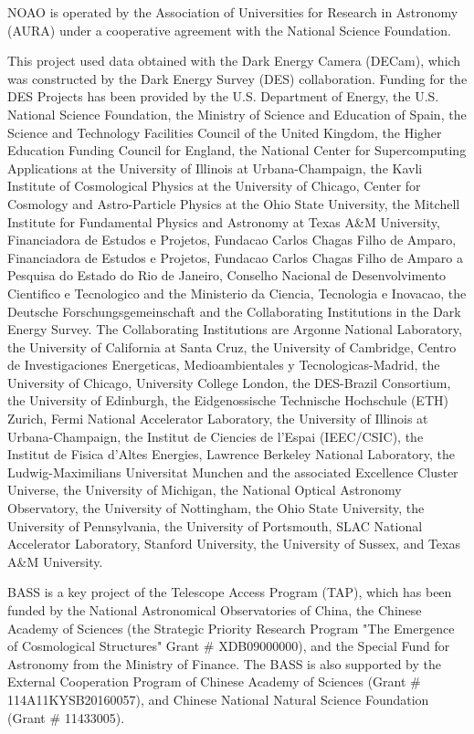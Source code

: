 \documentclass[letter]{aa}
\begin{document}
\begin{acknowledgements}
NOAO is operated by the Association of Universities for Research in Astronomy (AURA) under a cooperative agreement with the National Science Foundation.

This project used data obtained with the Dark Energy Camera (DECam), which was constructed by the Dark Energy Survey (DES) collaboration. Funding for the DES Projects has been provided by the U.S. Department of Energy, the U.S. National Science Foundation, the Ministry of Science and Education of Spain, the Science and Technology Facilities Council of the United Kingdom, the Higher Education Funding Council for England, the National Center for Supercomputing Applications at the University of Illinois at Urbana-Champaign, the Kavli Institute of Cosmological Physics at the University of Chicago, Center for Cosmology and Astro-Particle Physics at the Ohio State University, the Mitchell Institute for Fundamental Physics and Astronomy at Texas A\&M University, Financiadora de Estudos e Projetos, Fundacao Carlos Chagas Filho de Amparo, Financiadora de Estudos e Projetos, Fundacao Carlos Chagas Filho de Amparo a Pesquisa do Estado do Rio de Janeiro, Conselho Nacional de Desenvolvimento Cientifico e Tecnologico and the Ministerio da Ciencia, Tecnologia e Inovacao, the Deutsche Forschungsgemeinschaft and the Collaborating Institutions in the Dark Energy Survey. The Collaborating Institutions are Argonne National Laboratory, the University of California at Santa Cruz, the University of Cambridge, Centro de Investigaciones Energeticas, Medioambientales y Tecnologicas-Madrid, the University of Chicago, University College London, the DES-Brazil Consortium, the University of Edinburgh, the Eidgenossische Technische Hochschule (ETH) Zurich, Fermi National Accelerator Laboratory, the University of Illinois at Urbana-Champaign, the Institut de Ciencies de l'Espai (IEEC/CSIC), the Institut de Fisica d'Altes Energies, Lawrence Berkeley National Laboratory, the Ludwig-Maximilians Universitat Munchen and the associated Excellence Cluster Universe, the University of Michigan, the National Optical Astronomy Observatory, the University of Nottingham, the Ohio State University, the University of Pennsylvania, the University of Portsmouth, SLAC National Accelerator Laboratory, Stanford University, the University of Sussex, and Texas A\&M University.

BASS is a key project of the Telescope Access Program (TAP), which has been funded by the National Astronomical Observatories of China, the Chinese Academy of Sciences (the Strategic Priority Research Program "The Emergence of Cosmological Structures" Grant \# XDB09000000), and the Special Fund for Astronomy from the Ministry of Finance. The BASS is also supported by the External Cooperation Program of Chinese Academy of Sciences (Grant \# 114A11KYSB20160057), and Chinese National Natural Science Foundation (Grant \# 11433005).


\end{acknowledgements}
\end{document}
